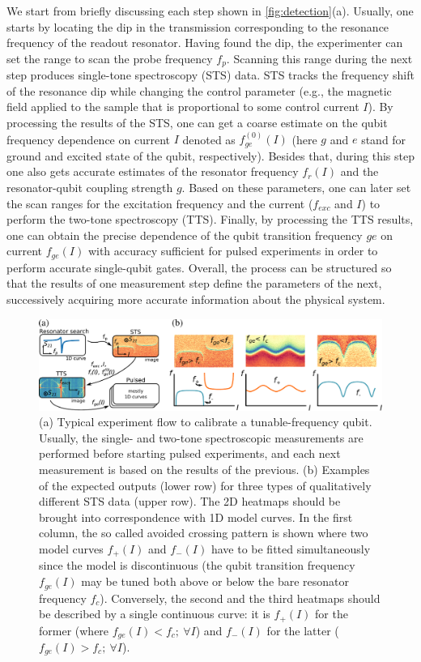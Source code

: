 \documentclass[%
 aip,
 amsmath,amssymb,
 reprint,%
]{revtex4-1}
\begin{document}
We start from briefly discussing each step shown in \autoref{fig:detection}(a). Usually, one starts by locating the dip in the transmission corresponding to the resonance frequency of the readout resonator. Having found the dip, the experimenter can set the range to scan the probe frequency $f_p$. Scanning this range during the next step produces single-tone spectroscopy (STS) data. STS tracks the frequency shift of the resonance dip while changing the control parameter (e.g., the magnetic field applied to the sample that is proportional to some control current $I$). By processing the results of the STS, one can get a coarse estimate on the qubit frequency dependence on current $I$  denoted as  $f^{(0)}_{ge}(I)$ (here $g$ and $e$ stand for ground and excited state of the qubit, respectively). Besides that, during this step one also gets accurate estimates of the resonator frequency $f_r(I)$ and the resonator-qubit coupling strength $g$. Based on these parameters, one can later set the scan ranges for the excitation frequency and the current ($f_{exc}$ and $I$) to perform the two-tone spectroscopy (TTS). Finally, by processing the TTS results, one can obtain the precise dependence of the qubit transition frequency $ge$ on current $f_{ge}(I)$	 with accuracy sufficient for pulsed experiments in order to perform accurate single-qubit gates. Overall, the process can be structured so that the results of one measurement step define the parameters of the next, successively acquiring more accurate information about the physical system.

\begin{figure}
	\centering
	\includegraphics[width=0.95\linewidth]{detection_sts}
	\caption{(a) Typical experiment flow to calibrate a tunable-frequency qubit. Usually, the single- and two-tone spectroscopic measurements are performed before starting pulsed experiments, and each next measurement is based on the results of the previous. (b) Examples of the expected outputs (lower row) for three types of qualitatively different STS data (upper row). The 2D heatmaps should be brought into correspondence with 1D model curves. In the first column, the so called avoided crossing pattern is shown where two model curves $f_+(I)$ and $f_-(I)$ have to be fitted simultaneously since the model is discontinuous (the qubit transition frequency $f_{ge}(I)$ may be tuned both above or below the bare resonator frequency $f_c$). Conversely, the second and the third heatmaps should be described by a single continuous curve: it is $f_+(I)$ for the former (where $f_{ge}(I)<f_c;\ \forall I$) and $f_-(I)$ for the latter ($f_{ge}(I)>f_c;\ \forall I$).}
	\label{fig:detection}	
\end{figure} 
\end{document}
